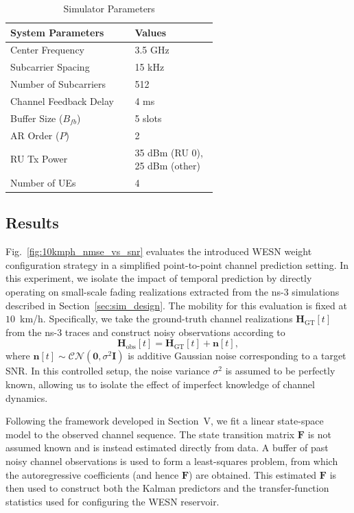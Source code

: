 \documentclass[lettersize,journal]{IEEEtran}
\begin{document}
\begin{table}[ht]
    \centering
    \caption{Simulator Parameters}
    \begin{tabularx}{0.9\linewidth}{p{0.6\linewidth}X}
    \toprule
    System Parameters & Values  \\
    \midrule
    Center Frequency & 3.5 GHz \\
    Subcarrier Spacing & 15 kHz \\
    Number of Subcarriers & 512 \\
    Channel Feedback Delay & 4 ms \\
    Buffer Size ($B_{fb}$) & 5 slots \\
    AR Order ($P$) & 2 \\
    RU Tx Power & 35 dBm (RU 0), 25 dBm (other) \\
    Number of UEs & 4 \\
    \bottomrule
    \end{tabularx}
    \label{tab:sim_params}
\end{table}


\subsection{Results}

Fig.~\ref{fig:10kmph_nmse_vs_snr} evaluates the introduced WESN weight configuration strategy in a simplified point-to-point channel prediction setting. In this experiment, we isolate the impact of temporal prediction by directly operating on small-scale fading realizations extracted from the ns-3 simulations described in Section~\ref{sec:sim_design}. The mobility for this evaluation is fixed at $10$~km/h. Specifically, we take the ground-truth channel realizations $\mathbf{H}_{\mathrm{GT}}[t]$ from the ns-3 traces and construct noisy observations according to
\begin{equation}
\mathbf{H}_{\mathrm{obs}}[t] = \mathbf{H}_{\mathrm{GT}}[t] + \mathbf{n}[t],
\end{equation}
where $\mathbf{n}[t] \sim \mathcal{CN}(\mathbf{0}, \sigma^2 \mathbf{I})$ is additive Gaussian noise corresponding to a target SNR. In this controlled setup, the noise variance $\sigma^2$ is assumed to be perfectly known, allowing us to isolate the effect of imperfect knowledge of channel dynamics.

Following the framework developed in Section~V, we fit a linear state-space model to the observed channel sequence. 
The state transition matrix $\mathbf{F}$ is not assumed known and is instead estimated directly from data.
A buffer of past noisy channel observations is used to form a least-squares problem, from which the autoregressive coefficients (and hence $\mathbf{F}$) are obtained. 
This estimated $\mathbf{F}$ is then used to construct both the Kalman predictors and the transfer-function statistics used for configuring the WESN reservoir.
\end{document}
